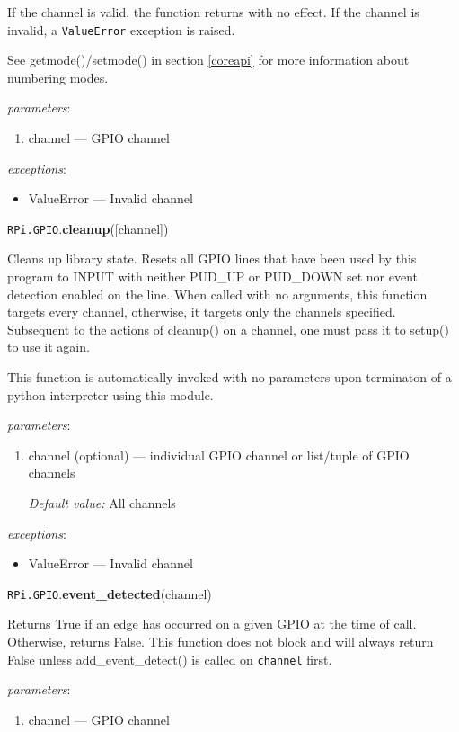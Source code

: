 \documentclass[12pt]{article}
\begin{document}
If the channel is valid, the function returns with no effect.
If the channel is invalid, a \texttt{ValueError} exception is raised.

See getmode()/setmode() in section \ref{coreapi} for more information about numbering modes.

\textit{parameters}:
\begin{enumerate}      
    \item channel --- GPIO channel
\end{enumerate}
 
\textit{exceptions}:
\begin{itemize}
    \item ValueError --- Invalid channel
\end{itemize}

\noindent \texttt{RPi.GPIO}.\textbf{cleanup}([channel])

Cleans up library state. Resets all GPIO lines that have been used by this program to INPUT with neither PUD\_UP or PUD\_DOWN set nor event detection enabled on the line. When called with no arguments, this function targets every channel, otherwise, it targets only the channels specified. Subsequent to the actions of cleanup() on a channel, one must pass it to setup() to use it again.

This function is automatically invoked with no parameters
upon terminaton of a python interpreter using this module.

\textit{parameters}:
\begin{enumerate}      
        \item channel (optional) --- individual GPIO channel or list/tuple of GPIO channels
        
        \textit{Default value:} All channels
\end{enumerate}
 
\textit{exceptions}:
\begin{itemize}
    \item ValueError --- Invalid channel
\end{itemize}

\noindent \texttt{RPi.GPIO}.\textbf{event\_detected}(channel)

Returns True if an edge has occurred on a given GPIO at the time of call. Otherwise, returns False. This function does not block and will always return False unless add\_event\_detect() is called on \texttt{channel} first.


\textit{parameters}:
\begin{enumerate}      
        \item channel --- GPIO channel
\end{enumerate}
 
\end{document}
